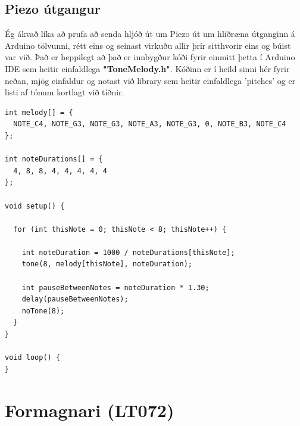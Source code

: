 \documentclass{article}
\begin{document}
\begin{figure}[H]
 \label{Piezo-inn}

\begin{center}
\end{center}
\end{figure}

\newpage %

\subsection{Piezo útgangur}

\begin{flushleft}
Ég ákvað líka að prufa að senda hljóð út um Piezo út um hliðræna útganginn á Arduino tölvunni,  rétt eins og seinast virkuðu allir þrír sitthvorir eins og búist var við.  Það er heppilegt að það er innbygður kóði fyrir einmitt þetta í Arduino IDE sem heitir einfaldlega \textbf{"ToneMelody.h"}.  Kóðinn er í heild sinni hér fyrir neðan,  mjög einfaldur og notast við library sem heitir einfaldlega 'pitches' og er listi af tónum kortlagt við tíðnir. 



\begin{lstlisting}[language=Arduino, caption=Tone Melody Kóði, frame=none,label=generatedcode] 
int melody[] = {
  NOTE_C4, NOTE_G3, NOTE_G3, NOTE_A3, NOTE_G3, 0, NOTE_B3, NOTE_C4
};

int noteDurations[] = {
  4, 8, 8, 4, 4, 4, 4, 4
};

void setup() {

  for (int thisNote = 0; thisNote < 8; thisNote++) {

    int noteDuration = 1000 / noteDurations[thisNote];
    tone(8, melody[thisNote], noteDuration);

    int pauseBetweenNotes = noteDuration * 1.30;
    delay(pauseBetweenNotes);
    noTone(8);
  }
}

void loop() {
}

\end{lstlisting}
\end{flushleft}
\newpage %

\section{Formagnari (LT072)}
\end{document}
